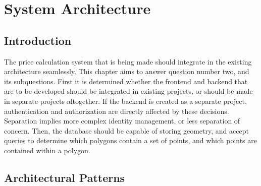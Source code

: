 \chapter{System Architecture}

\ifpdf
	\graphicspath{{Chapter3/Figs/Raster/}{Chapter3/Figs/PDF/}{Chapter3/Figs/}}
\else
	\graphicspath{{Chapter3/Figs/Vector/}{Chapter3/Figs/}}
\fi

\section{Introduction}

The price calculation system that is being made should integrate in the existing architecture seamlessly. This chapter aims to answer question number two, and its subquestions. First it is determined whether the frontend and backend that are to be developed should be integrated in existing projects, or should be made in separate projects altogether. If the backend is created as a separate project, authentication and authorization are directly affected by these decisions. Separation implies more complex identity management, or less separation of concern. Then, the database should be capable of storing geometry, and accept queries to determine which polygons contain a set of points, and which points are contained within a polygon.

\section{Architectural Patterns}


